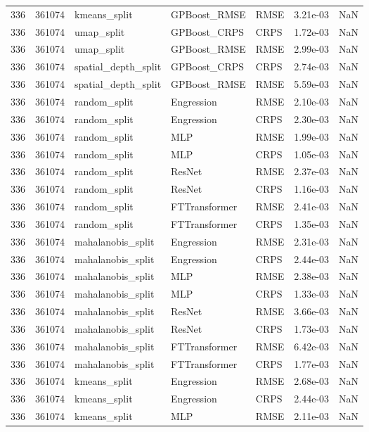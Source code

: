 \begin{tabular}{rrlllrr}
336 & 361074 & kmeans\_split & GPBoost\_RMSE & RMSE & 3.21e-03 & NaN \\
336 & 361074 & umap\_split & GPBoost\_CRPS & CRPS & 1.72e-03 & NaN \\
336 & 361074 & umap\_split & GPBoost\_RMSE & RMSE & 2.99e-03 & NaN \\
336 & 361074 & spatial\_depth\_split & GPBoost\_CRPS & CRPS & 2.74e-03 & NaN \\
336 & 361074 & spatial\_depth\_split & GPBoost\_RMSE & RMSE & 5.59e-03 & NaN \\
336 & 361074 & random\_split & Engression & RMSE & 2.10e-03 & NaN \\
336 & 361074 & random\_split & Engression & CRPS & 2.30e-03 & NaN \\
336 & 361074 & random\_split & MLP & RMSE & 1.99e-03 & NaN \\
336 & 361074 & random\_split & MLP & CRPS & 1.05e-03 & NaN \\
336 & 361074 & random\_split & ResNet & RMSE & 2.37e-03 & NaN \\
336 & 361074 & random\_split & ResNet & CRPS & 1.16e-03 & NaN \\
336 & 361074 & random\_split & FTTransformer & RMSE & 2.41e-03 & NaN \\
336 & 361074 & random\_split & FTTransformer & CRPS & 1.35e-03 & NaN \\
336 & 361074 & mahalanobis\_split & Engression & RMSE & 2.31e-03 & NaN \\
336 & 361074 & mahalanobis\_split & Engression & CRPS & 2.44e-03 & NaN \\
336 & 361074 & mahalanobis\_split & MLP & RMSE & 2.38e-03 & NaN \\
336 & 361074 & mahalanobis\_split & MLP & CRPS & 1.33e-03 & NaN \\
336 & 361074 & mahalanobis\_split & ResNet & RMSE & 3.66e-03 & NaN \\
336 & 361074 & mahalanobis\_split & ResNet & CRPS & 1.73e-03 & NaN \\
336 & 361074 & mahalanobis\_split & FTTransformer & RMSE & 6.42e-03 & NaN \\
336 & 361074 & mahalanobis\_split & FTTransformer & CRPS & 1.77e-03 & NaN \\
336 & 361074 & kmeans\_split & Engression & RMSE & 2.68e-03 & NaN \\
336 & 361074 & kmeans\_split & Engression & CRPS & 2.44e-03 & NaN \\
336 & 361074 & kmeans\_split & MLP & RMSE & 2.11e-03 & NaN \\

\end{tabular}
